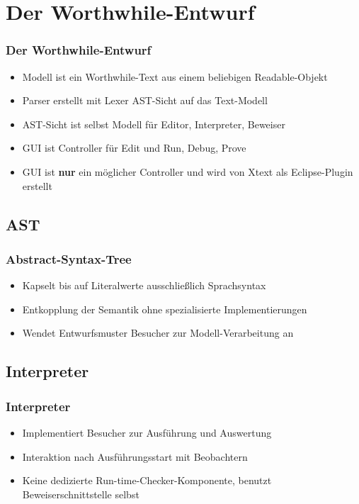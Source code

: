 \documentclass[t]{beamer}
\begin{document}
\section{Der Worthwhile-Entwurf}

\begin{frame}
\frametitle{Der Worthwhile-Entwurf}

\begin{itemize}
    \item<+-> Modell ist ein Worthwhile-Text aus einem beliebigen Readable-Objekt
    \item<+-> Parser erstellt mit Lexer AST-Sicht auf das Text-Modell
    \item<+-> AST-Sicht ist selbst Modell für Editor, Interpreter, Beweiser
    \item<+-> GUI ist Controller für Edit und Run, Debug, Prove
    \item<+-> GUI ist \textbf{nur} ein möglicher Controller und wird von Xtext als Eclipse-Plugin erstellt
\end{itemize}
\end{frame}

\subsection{AST}

\begin{frame}
\frametitle{Abstract-Syntax-Tree}

\begin{itemize}
    \item<+-> Kapselt bis auf Literalwerte ausschließlich Sprachsyntax
    \item<+-> Entkopplung der Semantik ohne spezialisierte Implementierungen
    \item<+-> Wendet Entwurfsmuster Besucher zur Modell-Verarbeitung an
\end{itemize}
\end{frame}

\subsection{Interpreter}

\begin{frame}
\frametitle{Interpreter}

\begin{itemize}
    \item<+-> Implementiert Besucher zur Ausführung und Auswertung
    \item<+-> Interaktion nach Ausführungsstart mit Beobachtern
    \item<+-> Keine dedizierte Run-time-Checker-Komponente, benutzt Beweiserschnittstelle selbst
\end{itemize}
\end{frame}
\end{document}
